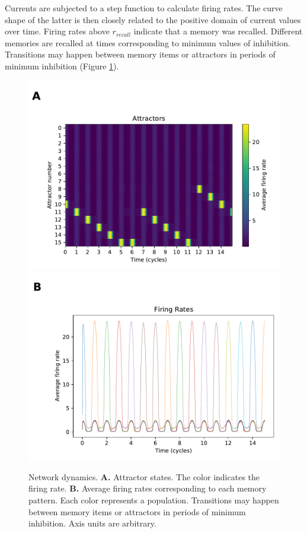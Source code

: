     Currents are subjected to a step function to calculate firing rates.
    The curve shape of the latter is then closely related to the positive domain of current values over time.
    Firing rates above \(r_{recall}\) indicate that a memory was recalled.
    Different memories are recalled at times corresponding to minimum values of inhibition.
    Transitions may happen between memory items or attractors in periods of minimum inhibition (Figure \ref{fig:firing_rates}).

    \begin{figure}
        \includegraphics[width=\textwidth]{graphics/firing_rates_attractors.pdf}
        \includegraphics[width=\textwidth]{graphics/firing_rates_lines.pdf}
        \caption{
        Network dynamics.
        \textbf{A.} Attractor states.
        The color indicates the firing rate.
        \textbf{B.} Average firing rates corresponding to each memory pattern.
        Each color represents a population.
        Transitions may happen between memory items or attractors in periods of minimum inhibition.
        Axis units are arbitrary.
        }
        \label{fig:firing_rates}
    \end{figure}
    

